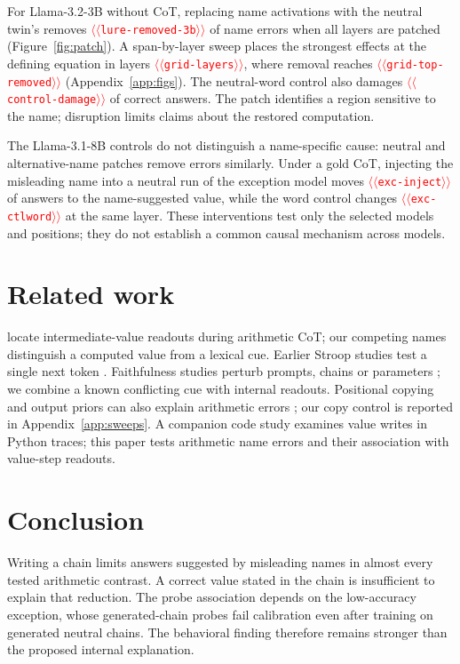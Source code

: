 \documentclass[11pt]{article}
\providecommand{\NUM}[1]{\textcolor{red}{$\langle\langle$\texttt{#1}$\rangle\rangle$}}
\begin{document}
For Llama-3.2-3B without CoT, replacing name activations with the neutral twin's removes
\NUM{lure-removed-3b} of name errors when all layers are patched (Figure~\ref{fig:patch}).
A span-by-layer sweep places the strongest effects at the
defining equation in layers \NUM{grid-layers}, where removal reaches \NUM{grid-top-removed}
(Appendix~\ref{app:figs}). The neutral-word control also damages \NUM{control-damage} of correct
answers. The patch identifies a region sensitive to the name; disruption limits claims about the restored computation.

The Llama-3.1-8B controls do not distinguish a name-specific cause: neutral and alternative-name
patches remove errors similarly. Under a gold CoT, injecting the misleading name into a neutral
run of the exception model moves \NUM{exc-inject} of answers to the name-suggested value, while the word control
changes \NUM{exc-ctlword} at the same layer. These interventions test only the selected models and positions; they do not establish a common causal mechanism across models.



\section{Related work}

\citet{kudo2026faithful} locate intermediate-value readouts during arithmetic CoT; our competing
names distinguish a computed value from a lexical cue. Earlier Stroop studies test a single next
token \cite{wang2026stroop,hu2026conflict}. Faithfulness studies perturb prompts, chains or
parameters \cite{turpin2023unfaithful,lanham2023measuring,chen2025reasoning,tutek2025unlearning};
we combine a known conflicting cue with internal readouts. Positional copying and output priors
can also explain arithmetic errors \cite{liu2026readout,prabhakar2024deciphering}; our copy
control is reported in Appendix~\ref{app:sweeps}.
A companion code study \citep{anon2026code} examines value writes in Python traces; this
paper tests arithmetic name errors and their association with value-step readouts.

\section{Conclusion}

Writing a chain limits answers suggested by misleading names in almost every tested arithmetic contrast.
A correct value stated in the chain is insufficient to explain that reduction. The probe
association depends on the low-accuracy exception, whose generated-chain probes fail calibration
even after training on generated neutral chains.
The behavioral finding therefore remains stronger than the proposed internal explanation.
\end{document}
